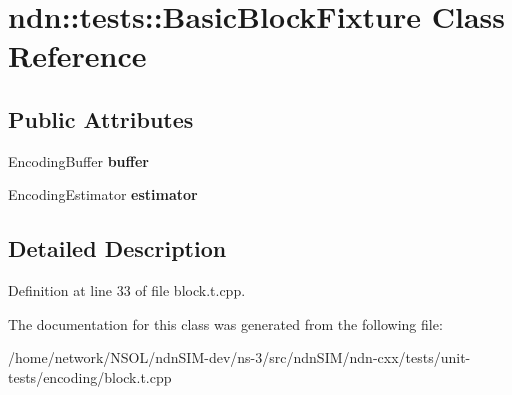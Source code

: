 \hypertarget{classndn_1_1tests_1_1BasicBlockFixture}{}\section{ndn\+:\+:tests\+:\+:Basic\+Block\+Fixture Class Reference}
\label{classndn_1_1tests_1_1BasicBlockFixture}
\subsection*{Public Attributes}
\begin{DoxyCompactItemize}
\item 
Encoding\+Buffer {\bfseries buffer}\hypertarget{classndn_1_1tests_1_1BasicBlockFixture_a1965a89c48d055a5b328855dee7947a6}{}\label{classndn_1_1tests_1_1BasicBlockFixture_a1965a89c48d055a5b328855dee7947a6}

\item 
Encoding\+Estimator {\bfseries estimator}\hypertarget{classndn_1_1tests_1_1BasicBlockFixture_a2ffd7da32bb3ebbfb6933932f9ef9266}{}\label{classndn_1_1tests_1_1BasicBlockFixture_a2ffd7da32bb3ebbfb6933932f9ef9266}

\end{DoxyCompactItemize}


\subsection{Detailed Description}


Definition at line 33 of file block.\+t.\+cpp.



The documentation for this class was generated from the following file\+:\begin{DoxyCompactItemize}
\item 
/home/network/\+N\+S\+O\+L/ndn\+S\+I\+M-\/dev/ns-\/3/src/ndn\+S\+I\+M/ndn-\/cxx/tests/unit-\/tests/encoding/block.\+t.\+cpp\end{DoxyCompactItemize}
